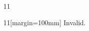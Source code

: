 \documentclass[paper=A4]{ropas-poster}
\begin{document}
\begin{postergrid}{1}{1}
\begin{posterblock}{1}{1}[margin=100mm]
Invalid.
\end{posterblock}
\end{postergrid}
\end{document}
